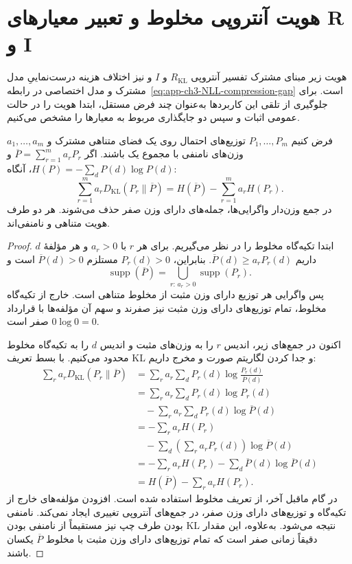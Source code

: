 \section{هویت آنتروپی مخلوط و تعبیر معیارهای R و I}
\label{app:ch3-entropy-mixture}
هویت زیر مبنای مشترک تفسیر آنتروپی
$R_{\mathrm{KL}}$ و $I$ و نیز اختلاف هزینه
درست‌نماییِ مدل مشترک و مدل اختصاصی در
رابطه~\eqref{eq:app-ch3-NLL-compression-gap} است.
برای جلوگیری از تلقی این کاربردها به‌عنوان
چند فرض مستقل، ابتدا هویت را در حالت عمومی
اثبات و سپس دو جایگذاری مربوط به معیارها را
مشخص می‌کنیم.

\begin{proposition}\label{prop:app-ch3-entropy-mixture}
فرض کنیم $P_1,\ldots,P_m$ توزیع‌های احتمال روی
یک فضای متناهی مشترک و $a_1,\ldots,a_m$ وزن‌های
نامنفی با مجموع یک باشند. اگر
$\overline P=\sum_{r=1}^{m}a_rP_r$ و
$H(P)=-\sum_dP(d)\log P(d)$، آنگاه:
\begin{equation}\label{eq:app-ch3-mixture-entropy}
\boxed{
\sum_{r=1}^{m}a_rD_{\mathrm{KL}}(P_r\|\overline P)
=H(\overline P)-\sum_{r=1}^{m}a_rH(P_r).
}
\end{equation}
در جمع وزن‌دار واگرایی‌ها، جمله‌های دارای وزن صفر
حذف می‌شوند. هر دو طرف هویت متناهی و نامنفی‌اند.
\end{proposition}
\begin{proof}
ابتدا تکیه‌گاه مخلوط را در نظر می‌گیریم. برای هر
$r$ با $a_r>0$ و هر مؤلفهٔ $d$ داریم
$\overline P(d)\ge a_rP_r(d)$. بنابراین،
$P_r(d)>0$ مستلزم $\overline P(d)>0$ است و
\[
\operatorname{supp}(\overline P)
=\bigcup_{r:\,a_r>0}\operatorname{supp}(P_r).
\]
پس واگرایی هر توزیع دارای وزن مثبت از مخلوط
متناهی است. خارج از تکیه‌گاه مخلوط، تمام
توزیع‌های دارای وزن مثبت نیز صفرند و سهم آن
مؤلفه‌ها با قرارداد $0\log0=0$ صفر است.

اکنون در جمع‌های زیر، اندیس $r$ را به وزن‌های
مثبت و اندیس $d$ را به تکیه‌گاه مخلوط محدود
می‌کنیم. با بسط تعریف KL و جدا کردن لگاریتم
صورت و مخرج داریم:
\begin{equation}\label{eq:app-ch3-mixture-entropy-proof}
\begin{aligned}
\sum_r a_rD_{\mathrm{KL}}(P_r\|\overline P)
&=\sum_r a_r\sum_d P_r(d)
\log\frac{P_r(d)}{\overline P(d)}\\
&=\sum_r a_r\sum_dP_r(d)\log P_r(d)\\
&\quad-\sum_r a_r\sum_dP_r(d)\log\overline P(d)\\
&=-\sum_r a_r H(P_r)\\
&\quad-\sum_d\left(\sum_r a_rP_r(d)\right)
\log\overline P(d)\\
&=-\sum_r a_rH(P_r)
-\sum_d\overline P(d)\log\overline P(d)\\
&=H(\overline P)-\sum_r a_rH(P_r).
\end{aligned}
\end{equation}
در گام ماقبل آخر، از تعریف مخلوط استفاده شده
است. افزودن مؤلفه‌های خارج از تکیه‌گاه و
توزیع‌های دارای وزن صفر، در جمع‌های آنتروپی
تغییری ایجاد نمی‌کند. نامنفی بودن طرف چپ
نیز مستقیماً از نامنفی بودن KL نتیجه می‌شود.
به‌علاوه، این مقدار دقیقاً زمانی صفر است که
تمام توزیع‌های دارای وزن مثبت با مخلوط
$\overline P$ یکسان باشند.
\end{proof}

